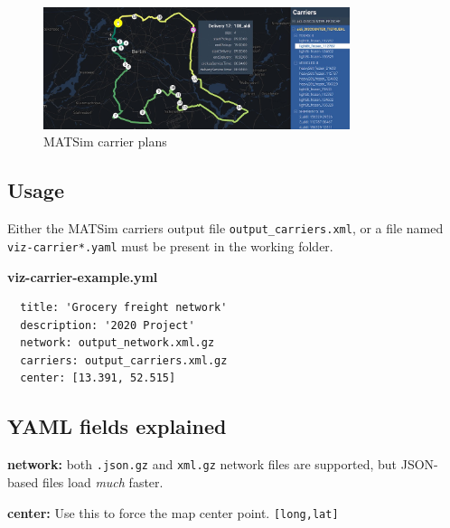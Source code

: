 \begin{figure}[H]
  \centering
  \includegraphics[width=0.8\textwidth]{assets/carriers.jpg}
  \caption{MATSim carrier plans}
\end{figure}


\hypertarget{usage}{%
\subsection{Usage}}

Either the MATSim carriers output file \texttt{output\_carriers.xml}, or a file named \texttt{viz-carrier*.yaml} must be present in the working folder.

\textbf{viz-carrier-example.yml}

\begin{lstlisting}
  title: 'Grocery freight network'
  description: '2020 Project'
  network: output_network.xml.gz
  carriers: output_carriers.xml.gz
  center: [13.391, 52.515]
\end{lstlisting}

\hypertarget{yaml-fields-explained}{%
\subsection{YAML fields explained}}

\textbf{network:} both \texttt{.json.gz} and \texttt{xml.gz} network
files are supported, but JSON-based files load \emph{much} faster.

\textbf{center:} Use this to force the map center point.
\texttt{{[}long,lat{]}}
